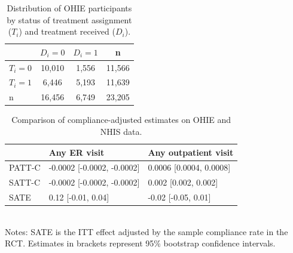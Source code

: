 \documentclass[hidelinks,12pt]{article}
\begin{document}
{\begin{appendices}
\begin{table}[h]
	\begin{center}
	\caption{Distribution of OHIE participants by status of treatment assignment ($T_i$) and treatment received ($D_i$).\label{ohie-status}} 
	\begin{tabular}{@{}lccc@{}}
		\toprule
		& $D_i = 0$ & $D_i = 1$ & n      \\ \midrule
		$T_i = 0$ & 10,010    & 1,556     & 11,566 \\
		$T_i = 1$ & 6,446     & 5,193     & 11,639 \\
		n         & 16,456    & 6,749     & 23,205 \\ \bottomrule
	\end{tabular}
	\end{center}
\end{table}

\begin{table}[h]
	\caption{Comparison of compliance-adjusted estimates on OHIE and NHIS data.\label{compliance-compare}} 
	\begin{tabular}{@{}lll@{}}
		\toprule
		\backslashbox{Estimator}{Outcome} & Any ER visit                   & Any outpatient visit        \\ \midrule
		PATT-C                                               & -0.0002 {[}-0.0002, -0.0002{]} & 0.0006 {[}0.0004, 0.0008{]} \\
		SATT-C                                               & -0.0002 {[}-0.0002, -0.0002{]} & 0.002 {[}0.002, 0.002{]}    \\
		SATE                                                 & 0.12 {[}-0.01, 0.04{]}          & -0.02 {[}-0.05, 0.01{]}    \\ \bottomrule
	\end{tabular}\\
\footnotesize{Notes: SATE is the ITT effect adjusted by the sample compliance rate in the RCT. Estimates in brackets represent 95\% bootstrap confidence intervals.}
\end{table}


\end{appendices}}
\end{document}
